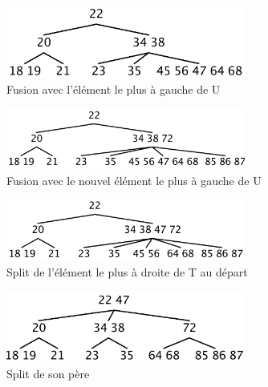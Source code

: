 \documentclass[10pt,a4paper]{article}
\begin{document}
\begin{figure}[!h]
	\begin{center}
		\includegraphics[width=0.7\textwidth]{1.png}
		\caption{Fusion avec l'élément le plus à gauche de U}
		\label{1}
	\end{center}
\end{figure}

\begin{figure}[!h]
	\begin{center}
		\includegraphics[width=0.7\textwidth]{2.png}
		\caption{Fusion avec le nouvel élément le plus à gauche de U}
		\label{2}
	\end{center}
\end{figure}

\begin{figure}[!h]
	\begin{center}
		\includegraphics[width=0.7\textwidth]{3.png}
		\caption{Split de l'élément le plus à droite de T au départ}
		\label{3}
	\end{center}
\end{figure}

\begin{figure}[!h]
	\begin{center}
		\includegraphics[width=0.7\textwidth]{4.png}
		\caption{Split de son père}
		\label{4}
	\end{center}
\end{figure}
\end{document}
